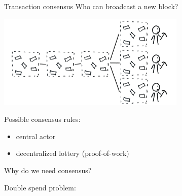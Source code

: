 \documentclass[]{beamer}
\begin{document}
\begin{frame}{Transaction consensus}
Who can broadcast a new block? \\ \vspace{1.5em}


\includegraphics[width=9cm]{../assets/images/consensus_problem.png}

Possible consensus rules: \\
	\begin{itemize}
	\item central actor
	\item decentralized lottery (proof-of-work)
	\end{itemize} 
\end{frame}


\begin{frame}{Why do we need consensus?}

Double spend problem: \\
\begin{figure}[h!]
	\center
	
\end{figure}
\end{frame}
\end{document}

